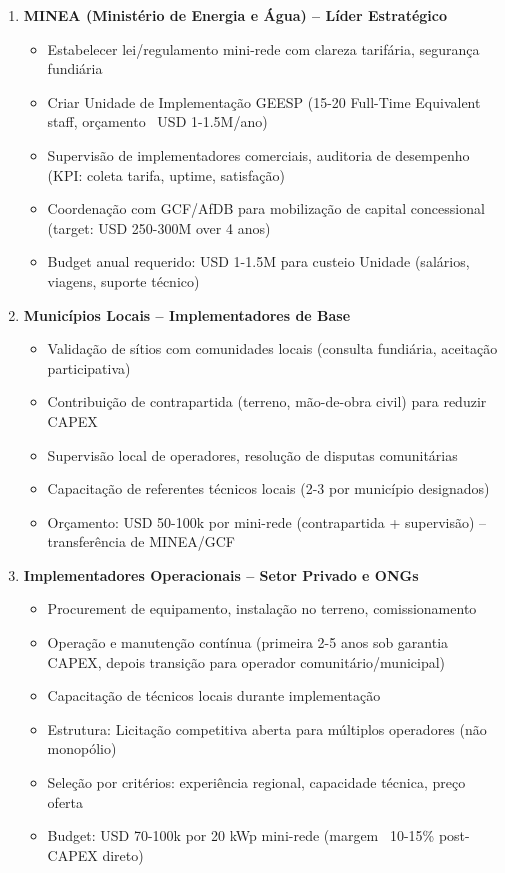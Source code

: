 \documentclass[12pt, a4paper]{article}
\begin{document}
\begin{enumerate}
\item \textbf{MINEA (Ministério de Energia e Água) -- Líder Estratégico}
   \begin{itemize}
   \item Estabelecer lei/regulamento mini-rede com clareza tarifária, segurança fundiária
   \item Criar Unidade de Implementação GEESP (15-20 Full-Time Equivalent staff, orçamento ~USD 1-1.5M/ano)
   \item Supervisão de implementadores comerciais, auditoria de desempenho (KPI: coleta tarifa, uptime, satisfação)
   \item Coordenação com GCF/AfDB para mobilização de capital concessional (target: USD 250-300M over 4 anos)
   \item Budget anual requerido: USD 1-1.5M para custeio Unidade (salários, viagens, suporte técnico)
   \end{itemize}

\item \textbf{Municípios Locais -- Implementadores de Base}
   \begin{itemize}
   \item Validação de sítios com comunidades locais (consulta fundiária, aceitação participativa)
   \item Contribuição de contrapartida (terreno, mão-de-obra civil) para reduzir CAPEX
   \item Supervisão local de operadores, resolução de disputas comunitárias
   \item Capacitação de referentes técnicos locais (2-3 por município designados)
   \item Orçamento: USD 50-100k por mini-rede (contrapartida + supervisão) -- transferência de MINEA/GCF
   \end{itemize}

\item \textbf{Implementadores Operacionais -- Setor Privado e ONGs}
   \begin{itemize}
   \item Procurement de equipamento, instalação no terreno, comissionamento
   \item Operação e manutenção contínua (primeira 2-5 anos sob garantia CAPEX, depois transição para operador comunitário/municipal)
   \item Capacitação de técnicos locais durante implementação
   \item Estrutura: Licitação competitiva aberta para múltiplos operadores (não monopólio)
   \item Seleção por critérios: experiência regional, capacidade técnica, preço oferta
   \item Budget: USD 70-100k por 20 kWp mini-rede (margem ~10-15\% post-CAPEX direto)
   \end{itemize}


\end{enumerate}
\end{document}
